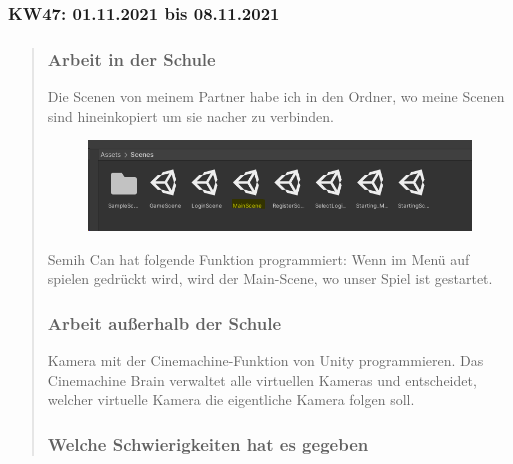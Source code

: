 

\subsubsection{KW47: 01.11.2021 bis 08.11.2021}
\begin{quote}
	\subsubsection*{Arbeit in der Schule}
		Die Scenen von meinem Partner habe ich in den Ordner, wo meine Scenen sind hineinkopiert um sie nacher zu verbinden.
	\begin{figure}
		\centering
		\includegraphics[width=0.7\linewidth]{img/SemihSoenmez_IMG/KW47_unity_scenes2}
		\caption{}
		\label{fig:kw47unityscenes2}
	\end{figure}
		Semih Can hat folgende Funktion programmiert: Wenn im Menü auf spielen gedrückt wird, wird der Main-Scene, wo unser Spiel ist gestartet. 
	
	\subsubsection*{Arbeit außerhalb der Schule}
	Kamera mit der Cinemachine-Funktion von Unity programmieren. Das Cinemachine Brain verwaltet alle virtuellen Kameras und entscheidet, welcher virtuelle Kamera die eigentliche Kamera folgen soll.
	
	\subsubsection*{Welche Schwierigkeiten hat es gegeben}

\end{quote}

